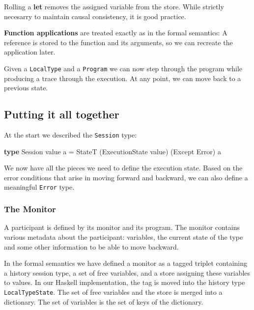 \documentclass[runningheads]{llncs}
\newenvironment{Shaded}{}{}
\newcommand{\KeywordTok}[1]{\textcolor[rgb]{0.00,0.44,0.13}{\textbf{#1}}}
\newcommand{\DataTypeTok}[1]{\textcolor[rgb]{0.56,0.13,0.00}{#1}}
\newcommand{\FunctionTok}[1]{\textcolor[rgb]{0.02,0.16,0.49}{#1}}
\newcommand{\NormalTok}[1]{#1}
\begin{document}
Rolling a \textbf{let} removes the assigned variable from the store.
While strictly necesarry to maintain causal consistency, it is good
practice.

\textbf{Function applications} are treated exactly as in the formal
semantics: A reference is stored to the function and its arguments, so
we can recreate the application later.

Given a \texttt{LocalType} and a \texttt{Program} we can now step
through the program while producing a trace through the execution. At
any point, we can move back to a previous state.

\subsection{Putting it all together}\label{putting-it-all-together}

At the start we described the \texttt{Session} type:
\begin{Shaded}
\begin{Highlighting}[]
\KeywordTok{type} \DataTypeTok{Session}\NormalTok{ value a }\FunctionTok{=} 
    \DataTypeTok{StateT}\NormalTok{ (}\DataTypeTok{ExecutionState}\NormalTok{ value) (}\DataTypeTok{Except} \DataTypeTok{Error}\NormalTok{) a}
\end{Highlighting}
\end{Shaded}

We now have all the pieces we need to define the execution state. Based
on the error conditions that arise in moving forward and backward, we
can also define a meaningful \texttt{Error} type.

\subsubsection{The Monitor}\label{the-monitor}

A participant is defined by its monitor and its program. The monitor
contains various metadata about the participant: variables, the current
state of the type and some other information to be able to move
backward.

In the formal semantics we have defined a monitor as a tagged triplet
containing a history session type, a set of free variables, and a store
assigning these variables to values. In our Haskell implementation, the
tag is moved into the history type \texttt{LocalTypeState}. The set of
free variables and the store is merged into a dictionary. The set of
variables is the set of keys of the dictionary.
\end{document}
